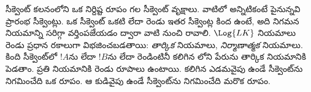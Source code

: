 \documentclass[../../../include/open-logic-section]{subfiles}
\begin{document}
సీక్వెంట్ కలనంలోని  ఒక నిర్దిష్ట రూపం గల సీక్వెంట్ వృక్షాలు.
వాటిలో అన్నిటికంటే పైనున్నవి ప్రారంభ సీక్వెంట్లు. ఒక సీక్వెంట్ ఒకటి
లేదా రెండు ఇతర సీక్వెంట్ల కింద ఉంటే, అది నిగమన నియమాన్ని సరిగ్గా
వర్తింపజేయడం ద్వారా వాటి నుంచి రావాలి. $\Log{LK}$ నియమాలు రెండు ప్రధాన
రకాలుగా విభజించబడతాయి: \emph{తార్కిక} నియమాలు, \emph{నిర్మాణాత్మక}
నియమాలు. కింది సీక్వెంట్‌లో $!A$ను లేదా $!B$ను లేదా రెండింటినీ కలిగిన
లోని  పేరును తార్కిక నియమానికి పెడతాం.
ప్రతి నియమానికి రెండు రూపాలు ఉంటాయి.  కలిగిన 
ఎడమవైపు ఉండే సీక్వెంట్‌ను నిగమించేది ఒక రూపం. ఆ  కుడివైపు
ఉండే సీక్వెంట్‌ను నిగమించేది మరొక రూపం.
\end{document}
